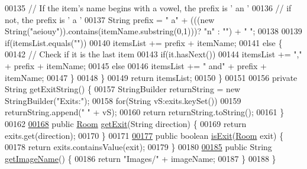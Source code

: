 \begin{DoxyCode}
00135             \textcolor{comment}{// If the item's name begins with a vowel, the prefix is ' an '}
00136             \textcolor{comment}{// if not, the prefix is ' a '}
00137             String prefix = \textcolor{stringliteral}{" a"} + (((\textcolor{keyword}{new} String(\textcolor{stringliteral}{"aeiouy"})).contains(itemName.substring(0,1)))? \textcolor{stringliteral}{"n"} : \textcolor{stringliteral}{""}) +
       \textcolor{stringliteral}{" "};
00138 
00139             \textcolor{keywordflow}{if}(itemsList.equals(\textcolor{stringliteral}{""}))
00140                 itemsList += prefix + itemName;
00141             \textcolor{keywordflow}{else} \{
00142                 \textcolor{comment}{// Check if it is the last item}
00143                 \textcolor{keywordflow}{if}(it.hasNext())
00144                     itemsList += \textcolor{stringliteral}{","} + prefix + itemName;
00145                 \textcolor{keywordflow}{else}
00146                     itemsList += \textcolor{stringliteral}{" and"} + prefix + itemName;
00147             \}
00148         \}
00149         \textcolor{keywordflow}{return} itemsList;
00150     \}
00151 
00156     \textcolor{keyword}{private} String getExitString() \{
00157         StringBuilder returnString = \textcolor{keyword}{new} StringBuilder(\textcolor{stringliteral}{"Exits:"});
00158         \textcolor{keywordflow}{for}(String vS:exits.keySet())
00159             returnString.append(\textcolor{stringliteral}{" "} + vS);
00160         \textcolor{keywordflow}{return} returnString.toString();
00161     \}
00162 
\hypertarget{Room_8java_source_l00168}{}\hyperlink{classRoom_a384ab8c844e5775f87de24d6c470637e}{00168}     \textcolor{keyword}{public} \hyperlink{classRoom}{Room} \hyperlink{classRoom_a384ab8c844e5775f87de24d6c470637e}{getExit}(String direction) \{
00169         \textcolor{keywordflow}{return} exits.get(direction);
00170     \}
00171 
\hypertarget{Room_8java_source_l00177}{}\hyperlink{classRoom_a844b42638a0d2ce68df9adf1674f713b}{00177}     \textcolor{keyword}{public} \textcolor{keywordtype}{boolean} \hyperlink{classRoom_a844b42638a0d2ce68df9adf1674f713b}{isExit}(\hyperlink{classRoom}{Room} exit) \{
00178         \textcolor{keywordflow}{return} exits.containsValue(exit);
00179     \}
00180 
\hypertarget{Room_8java_source_l00185}{}\hyperlink{classRoom_a8177668df4d8be718812934673c42649}{00185}     \textcolor{keyword}{public} String \hyperlink{classRoom_a8177668df4d8be718812934673c42649}{getImageName}() \{
00186         \textcolor{keywordflow}{return} \textcolor{stringliteral}{"Images/"}  + imageName;
00187     \}
00188 \}
\end{DoxyCode}
